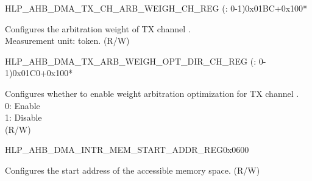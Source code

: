 \begin{register}{H}{LP\_AHB\_DMA\_TX\_CH\_ARB\_WEIGH\_CH\_REG (: 0-1)}{0x01BC+0x100*}\label{regdesc:LPAHBDMATXCHARBWEIGHCHNREG}
%
%
\regnewline%
\begin{regdesc}\begin{reglist}
\label{fielddesc:LPAHBDMATXCHARBWEIGHCHN}\item [LP\_AHB\_DMA\_TX\_CH\_ARB\_WEIGH\_CH\regindex{n}] Configures the arbitration weight of TX channel .\\Measurement unit: token. (R/W)
\end{reglist}\end{regdesc}
\end{register}


\begin{register}{H}{LP\_AHB\_DMA\_TX\_ARB\_WEIGH\_OPT\_DIR\_CH\_REG (: 0-1)}{0x01C0+0x100*}\label{regdesc:LPAHBDMATXARBWEIGHOPTDIRCHNREG}
%
%
\regnewline%
\begin{regdesc}\begin{reglist}
\label{fielddesc:LPAHBDMATXARBWEIGHOPTDIRCHN}\item [LP\_AHB\_DMA\_TX\_ARB\_WEIGH\_OPT\_DIR\_CH\regindex{n}] Configures whether to enable weight arbitration optimization for TX channel .\\
0: Enable\\
1: Disable\\ (R/W)
\end{reglist}\end{regdesc}
\end{register}


\begin{register}{H}{LP\_AHB\_DMA\_INTR\_MEM\_START\_ADDR\_REG}{0x0600}\label{regdesc:LPAHBDMAINTRMEMSTARTADDRREG}
%
\regnewline%
\begin{regdesc}\begin{reglist}
\label{fielddesc:LPAHBDMAACCESSINTRMEMSTARTADDR}\item [LP\_AHB\_DMA\_ACCESS\_INTR\_MEM\_START\_ADDR] Configures the start address of the accessible memory space. (R/W)
\end{reglist}\end{regdesc}
\end{register}


